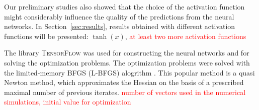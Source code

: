 Our preliminary studies also showed that the choice of the activation function might considerably influence the 
quality of the predictions from the neural networks. In Section~\ref{sec:results}, results obtained 
with different activation functions will be presented: $\tanh(x)$, 
\textcolor{red}{at least two more activation functions}

The library \textsc{TensorFlow} \cite{tensorflow2015-whitepaper} was used for constructing the neural networks and for solving the optimization problems. 
The optimization problems were solved with the 
limited-memory BFGS (L-BFGS) alogrithm  \cite{NW06}. This popular method is a  quasi  Newton method, which approximates the 
Hessian on the basis of  a prescribed maximal number of previous iterates.
\textcolor{red}{number of vectors used in the numerical simulations, initial value for optimization}

